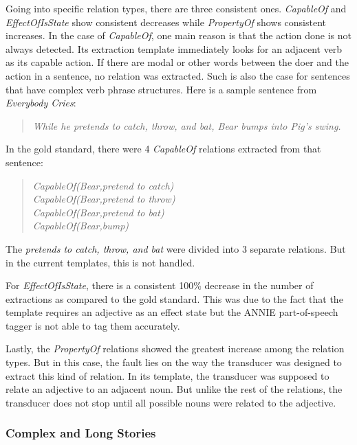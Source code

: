 Going into specific relation types, there are three consistent ones. \textit{CapableOf} and \textit{EffectOfIsState} show consistent decreases while \textit{PropertyOf} shows consistent increases. In the case of \textit{CapableOf}, one main reason is that the action done is not always detected. Its extraction template immediately looks for an adjacent verb as its capable action. If there are modal or other words between the doer and the action in a sentence, no relation was extracted. Such is also the case for sentences that have complex verb phrase structures. Here is a sample sentence from \textit{Everybody Cries}:

\begin{verse}
\itshape
While he pretends to catch, throw, and bat, Bear bumps into Pig's swing.
\end{verse}

In the gold standard, there were 4 \textit{CapableOf} relations extracted from that sentence:

\begin{verse}
\itshape
CapableOf(Bear,pretend to catch) \\ 
CapableOf(Bear,pretend to throw)\\
CapableOf(Bear,pretend to bat)\\
CapableOf(Bear,bump)\\
\end{verse}

The \textit{pretends to catch, throw, and bat} were divided into 3 separate relations. But in the current templates, this is not handled.

For \textit{EffectOfIsState}, there is a consistent 100\% decrease in the number of extractions as compared to the gold standard. This was due to the fact that the template requires an adjective as an effect state but the ANNIE part-of-speech tagger is not able to tag them accurately.

Lastly, the \textit{PropertyOf} relations showed the greatest increase among the relation types. But in this case, the fault lies on the way the transducer was designed to extract this kind of relation. In its template, the transducer was supposed to relate an adjective to an adjacent noun. But unlike the rest of the relations, the transducer does not stop until all possible nouns were related to the adjective.

\subsubsection*{Complex and Long Stories}

